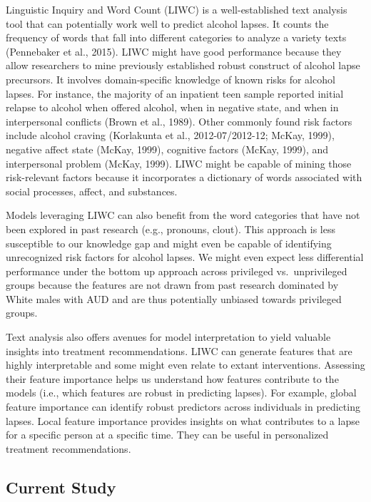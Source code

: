 \documentclass[
  letterpaper,
  DIV=11,
  numbers=noendperiod]{scrartcl}
\begin{document}
Linguistic Inquiry and Word Count (LIWC) is a well-established text
analysis tool that can potentially work well to predict alcohol lapses.
It counts the frequency of words that fall into different categories to
analyze a variety texts (Pennebaker et al., 2015). LIWC might have good
performance because they allow researchers to mine previously
established robust construct of alcohol lapse precursors. It involves
domain-specific knowledge of known risks for alcohol lapses. For
instance, the majority of an inpatient teen sample reported initial
relapse to alcohol when offered alcohol, when in negative state, and
when in interpersonal conflicts (Brown et al., 1989). Other commonly
found risk factors include alcohol craving (Korlakunta et al.,
2012-07/2012-12; McKay, 1999), negative affect state (McKay, 1999),
cognitive factors (McKay, 1999), and interpersonal problem (McKay,
1999). LIWC might be capable of mining those risk-relevant factors
because it incorporates a dictionary of words associated with social
processes, affect, and substances.

Models leveraging LIWC can also benefit from the word categories that
have not been explored in past research (e.g., pronouns, clout). This
approach is less susceptible to our knowledge gap and might even be
capable of identifying unrecognized risk factors for alcohol lapses. We
might even expect less differential performance under the bottom up
approach across privileged vs.~unprivileged groups because the features
are not drawn from past research dominated by White males with AUD and
are thus potentially unbiased towards privileged groups.

Text analysis also offers avenues for model interpretation to yield
valuable insights into treatment recommendations. LIWC can generate
features that are highly interpretable and some might even relate to
extant interventions. Assessing their feature importance helps us
understand how features contribute to the models (i.e., which features
are robust in predicting lapses). For example, global feature importance
can identify robust predictors across individuals in predicting lapses.
Local feature importance provides insights on what contributes to a
lapse for a specific person at a specific time. They can be useful in
personalized treatment recommendations.

\subsection{Current Study}\label{current-study}
\end{document}
